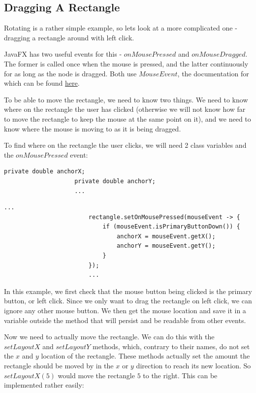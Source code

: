 \documentclass[a4paper]{report}
\newcommand{\link}[2]{\color{blue}\href{#1}{#2}\color{black}}
\begin{document}
			\subsection{Dragging A Rectangle}\label{subsec:dragging a rectangle}
			
				Rotating is a rather simple example, so lets look at a more complicated one - dragging a rectangle around with left click.
				
				JavaFX has two useful events for this - $onMousePressed$ and $onMouseDragged$. The former is called once when the mouse is pressed, and the latter continuously for as long as the node is dragged. Both use $MouseEvent$, the documentation for which can be found \link{https://docs.oracle.com/javase/8/javafx/api/javafx/scene/input/MouseEvent.html}{here}.
				
				To be able to move the rectangle, we need to know two things. We need to know where on the rectangle the user has clicked (otherwise we will not know how far to move the rectangle to keep the mouse at the same point on it), and we need to know where the mouse is moving to as it is being dragged.
				
				To find where on the rectangle the user clicks, we will need 2 class variables and the $onMousePressed$ event:
				
				\pagebreak
				
				\begin{lstlisting}[gobble=20]
					private double anchorX;
					private double anchorY;
					...
				\end{lstlisting}
				\begin{lstlisting}[gobble=20]
						...
						rectangle.setOnMousePressed(mouseEvent -> {
							if (mouseEvent.isPrimaryButtonDown()) {
								anchorX = mouseEvent.getX();
								anchorY = mouseEvent.getY();
							}
						});
						...
				\end{lstlisting}
				
				In this example, we first check that the mouse button being clicked is the primary button, or left click. Since we only want to drag the rectangle on left click, we can ignore any other mouse button. We then get the mouse location and save it in a variable outside the method that will persist and be readable from other events.
				
				Now we need to actually move the rectangle. We can do this with the $setLayoutX$ and $setLayoutY$ methods, which, contrary to their names, do not set the $x$ and $y$ location of the rectangle. These methods actually set the amount the rectangle should be moved by in the $x$ or $y$ direction to reach its new location. So $setLayoutX(5)$ would move the rectangle $5$ to the right. This can be implemented rather easily:
				
\end{document}
